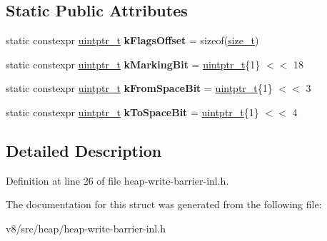 \subsection*{Static Public Attributes}
\begin{DoxyCompactItemize}
\item 
\mbox{\label{structv8_1_1internal_1_1heap__internals_1_1MemoryChunk_a295233365788857b47cf5adf340575d5}} 
static constexpr \mbox{\hyperlink{classuintptr__t}{uintptr\+\_\+t}} {\bfseries k\+Flags\+Offset} = sizeof(\mbox{\hyperlink{classsize__t}{size\+\_\+t}})
\item 
\mbox{\label{structv8_1_1internal_1_1heap__internals_1_1MemoryChunk_ad3d3e9e79c76a2a45aa2ecd4bbcf45a0}} 
static constexpr \mbox{\hyperlink{classuintptr__t}{uintptr\+\_\+t}} {\bfseries k\+Marking\+Bit} = \mbox{\hyperlink{classuintptr__t}{uintptr\+\_\+t}}\{1\} $<$$<$ 18
\item 
\mbox{\label{structv8_1_1internal_1_1heap__internals_1_1MemoryChunk_a8cbeb9632f3867a2e2901a553ecf3fce}} 
static constexpr \mbox{\hyperlink{classuintptr__t}{uintptr\+\_\+t}} {\bfseries k\+From\+Space\+Bit} = \mbox{\hyperlink{classuintptr__t}{uintptr\+\_\+t}}\{1\} $<$$<$ 3
\item 
\mbox{\label{structv8_1_1internal_1_1heap__internals_1_1MemoryChunk_a5e9d308076f0d2a2423cc792f785635f}} 
static constexpr \mbox{\hyperlink{classuintptr__t}{uintptr\+\_\+t}} {\bfseries k\+To\+Space\+Bit} = \mbox{\hyperlink{classuintptr__t}{uintptr\+\_\+t}}\{1\} $<$$<$ 4
\end{DoxyCompactItemize}


\subsection{Detailed Description}


Definition at line 26 of file heap-\/write-\/barrier-\/inl.\+h.



The documentation for this struct was generated from the following file\+:\begin{DoxyCompactItemize}
\item 
v8/src/heap/heap-\/write-\/barrier-\/inl.\+h\end{DoxyCompactItemize}
